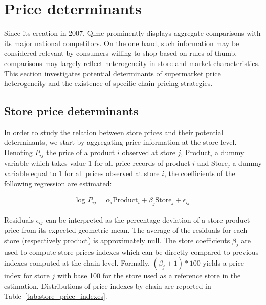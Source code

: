 \documentclass[english]{article}
\begin{document}
\section{Price determinants}

Since its creation in 2007, Qlmc prominently displays aggregate comparisons with its major national competitors. On the one hand, such information may be considered relevant by consumers willing to shop based on rules of thumb, comparisons may largely reflect heterogeneity in store and market characteristics. This section investigates potential determinants of supermarket price heterogeneity and the existence of specific chain pricing strategies.

\subsection{Store price determinants}

In order to study the relation between store prices and their potential determinants, we start by aggregating price information at the store level. Denoting $P_{ij}$ the price of a product $i$ observed at store $j$, $\text{Product}_i$ a dummy variable which takes value $1$ for all price records of product $i$ and $\text{Store}_j$ a dummy variable equal to $1$ for all prices observed at store $i$, the coefficients of the following regression are estimated:

\begin{align}
\text{log }P_{ij} = \alpha_i \text{Product}_i + \beta_j \text{Store}_j + \epsilon_{ij}
\label{reg_product_prices}
\end{align}

Residuals $\epsilon_{ij}$ can be interpreted as the percentage deviation of a store product price from its expected geometric mean. The average of the residuals for each store (respectively product) is approximately null. The store coefficients $\beta_j$ are used to compute store prices indexes which can be directly compared to previous indexes computed at the chain level. Formally, $(\beta_j + 1) * 100$ yields a price index for store $j$ with base 100 for the store used as a reference store in the estimation. Distributions of price indexes by chain are reported in Table~\ref{tab:store_price_indexes}.
\end{document}
